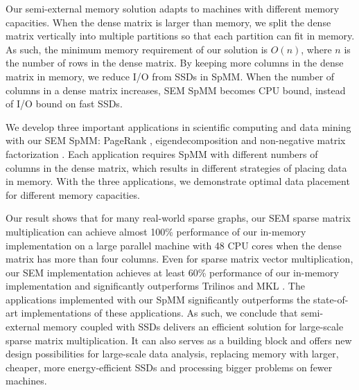 Our semi-external memory solution adapts to machines with different memory
capacities. When the dense matrix is larger than memory, we split the dense
matrix vertically into multiple partitions so that each partition can fit in
memory. As such, the minimum memory requirement of our solution is $O(n)$,
where $n$ is the number of rows in the dense matrix. By keeping more columns
in the dense matrix in memory, we reduce I/O from SSDs in SpMM. When the number
of columns in a dense matrix increases, SEM SpMM becomes CPU bound, instead of
I/O bound on fast SSDs.

We develop three important applications in scientific computing and
data mining with our SEM SpMM: PageRank \cite{pagerank}, eigendecomposition
\cite{} and non-negative matrix factorization \cite{nmf}. Each application
requires SpMM with different numbers of columns in the dense matrix, which
results in different strategies of placing data in memory.
With the three applications, we demonstrate optimal data placement for
different memory capacities.


Our result shows that for many real-world sparse graphs, our SEM sparse matrix
multiplication can achieve almost 100\% performance of our in-memory implementation
on a large parallel machine with 48 CPU cores
when the dense matrix has more than four columns. Even for sparse matrix vector
multiplication, our SEM implementation achieves at least 60\% performance of
our in-memory implementation and significantly outperforms Trilinos \cite{trilinos}
and MKL \cite{mkl}. The applications implemented with our SpMM significantly
outperforms the state-of-art implementations of these applications. As such,
we conclude that semi-external memory coupled with SSDs delivers an efficient
solution for large-scale sparse matrix multiplication. It can also serves
as a building block and offers new design possibilities for large-scale
data analysis, replacing memory with larger, cheaper, more energy-efficient SSDs
and processing bigger problems on fewer machines.
